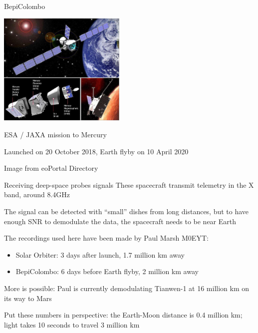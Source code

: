 \documentclass[aspectratio=169]{beamer}
\begin{document}
\begin{frame}{BepiColombo}
   \begin{center}
     \includegraphics[width=6.1cm]{BepiColombo_Auto6F}
   \end{center}

   ESA / JAXA mission to Mercury

   Launched on 20 October 2018, Earth flyby on 10 April 2020

   \begin{flushright}
    {\tiny * Image from eoPortal Directory}
  \end{flushright}
\end{frame}

\begin{frame}{Receiving deep-space probes signals}
  These spacecraft transmit telemetry in the X band, around 8.4GHz

  \medskip
  
  The signal can be detected with ``small'' dishes from long distances, but to
  have enough SNR to demodulate the data, the spacecraft needs to be near Earth

  \medskip
  
  The recordings used here have been made by Paul Marsh M0EYT:

  \begin{itemize}
  \item Solar Orbiter: 3 days after launch, 1.7 million km away
  \item BepiColombo: 6 days before Earth flyby, 2 million km away
  \end{itemize}

  More is possible: Paul is currently demodulating Tianwen-1 at 16 million km on
  its way to Mars

  \medskip

  Put these numbers in perspective: the Earth-Moon distance is 0.4 million km;
  light takes 10 seconds to travel 3 million km
  
\end{frame}
\end{document}
